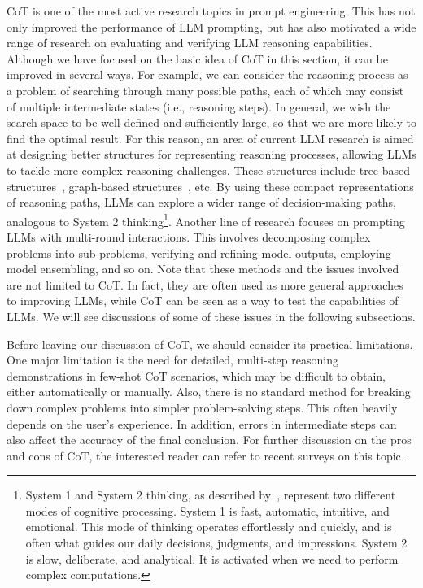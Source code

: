 CoT is one of the most active research topics in prompt engineering. This has not only improved the performance of LLM prompting, but has also motivated a wide range of research on evaluating and verifying LLM reasoning capabilities. Although we have focused on the basic idea of CoT in this section, it can be improved in several ways. For example, we can consider the reasoning process as a problem of searching through many possible paths, each of which may consist of multiple intermediate states (i.e., reasoning steps). In general, we wish the search space to be well-defined and sufficiently large, so that we are more likely to find the optimal result. For this reason, an area of current LLM research is aimed at designing better structures for representing reasoning processes, allowing LLMs to tackle more complex reasoning challenges. These structures include tree-based structures~\cite{yao-etal:2024tree}, graph-based structures~\cite{besta-etal:2024graph}, etc. By using these compact representations of reasoning paths, LLMs can explore a wider range of decision-making paths, analogous to System 2 thinking\footnote{System 1 and System 2 thinking, as described by~\citet{kahneman:2011thinking}, represent two different modes of cognitive processing. System 1 is fast, automatic, intuitive, and emotional. This mode of thinking operates effortlessly and quickly, and is often what guides our daily decisions, judgments, and impressions. System 2 is slow, deliberate, and analytical. It is activated when we need to perform complex computations.}. Another line of research focuses on prompting LLMs with multi-round interactions. This involves decomposing complex problems into sub-problems, verifying and refining model outputs, employing model ensembling, and so on. Note that these methods and the issues involved are not limited to CoT. In fact, they are often used as more general approaches to improving LLMs, while CoT can be seen as a way to test the capabilities of LLMs. We will see discussions of some of these issues in the following subsections.

Before leaving our discussion of CoT, we should consider its practical limitations. One major limitation is the need for detailed, multi-step reasoning demonstrations in few-shot CoT scenarios, which may be difficult to obtain, either automatically or manually. Also, there is no standard method for breaking down complex problems into simpler problem-solving steps. This often heavily depends on the user's experience. In addition, errors in intermediate steps can also affect the accuracy of the final conclusion. For further discussion on the pros and cons of CoT, the interested reader can refer to recent surveys on this topic~\cite{chu-etal:2023survey,yu-etal:2023towards,zhang-etal:2023igniting}.

